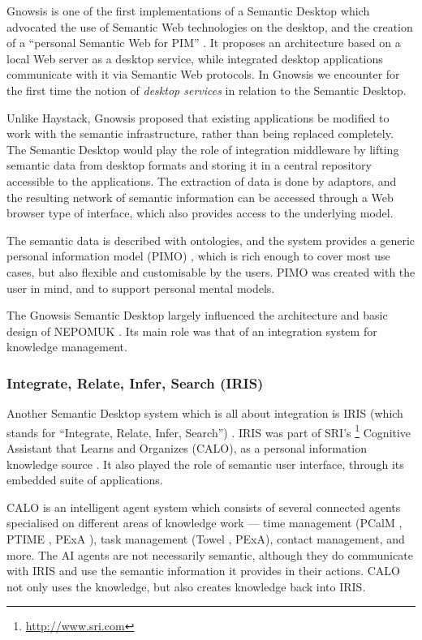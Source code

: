 Gnowsis \cite{Sauermann2003} is one of the first implementations of a Semantic Desktop which advocated the use of Semantic Web technologies on the desktop, and the creation of a ``personal Semantic Web for PIM'' \cite{Sauermann2009}. It proposes an architecture based on a local Web server as a desktop service, while integrated desktop applications communicate with it via Semantic Web protocols. In Gnowsis we encounter for the first time the notion of \emph{desktop services} in relation to the Semantic Desktop. 

Unlike Haystack, Gnowsis proposed that existing applications be modified to work with the semantic infrastructure, rather than being replaced completely. The Semantic Desktop would play the role of integration middleware by lifting semantic data from desktop formats and storing it in a central repository accessible to the applications. The extraction of data is done by adaptors, and the resulting network of semantic information can be accessed through a Web browser type of interface, which also provides access to the underlying model. 

The semantic data is described with ontologies, and the system provides a generic personal information model (PIMO) \cite{Sauermann2006}, which is rich enough to cover most use cases, but also flexible and customisable by the users. PIMO was created with the user in mind, and to support personal mental models. 

The Gnowsis Semantic Desktop largely influenced the architecture and basic design of NEPOMUK \cite{Bernardi2008}. Its main role was that of an integration system \cite{Sauermann2005a,Sauermann2005b} for knowledge management. 

\subsubsection{Integrate, Relate, Infer, Search (IRIS)}

Another Semantic Desktop system which is all about integration is IRIS (which stands for ``Integrate, Relate, Infer, Search'') \cite{Cheyer2005}. IRIS was part of  SRI's \footnote{\url{http://www.sri.com}} Cognitive Assistant that Learns and Organizes (CALO), as a personal information knowledge source \cite{Ambite2006}. It also played the role of semantic user interface, through its embedded suite of applications. 

CALO is an intelligent agent system which consists of several connected agents \cite{Ambite2005} specialised on different areas of knowledge work --- time management (PCalM \cite{Berry2004}, PTIME \cite{Berry2005a,Berry2011}, PExA \cite{Myers2007}), task management (Towel \cite{Conley2007}, PExA), contact management, and more. The AI agents are not necessarily semantic, although they do communicate with IRIS and use the semantic information it provides in their actions. CALO not only uses the knowledge, but also creates knowledge back into IRIS.

